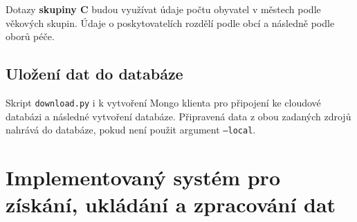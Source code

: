 \documentclass[11pt, a4paper]{article}
\theoremstyle{definition}
\theoremstyle{plain}
\begin{document}
Dotazy \textbf{skupiny C} budou využívat údaje počtu obyvatel v městech podle věkových skupin. Údaje o poskytovatelích rozdělí podle obcí a následně podle oborů péče.

\subsection{Uložení dat do databáze}
Skript \texttt{download.py} i k vytvoření Mongo klienta pro připojení ke cloudové databázi a následné vytvoření databáze. Připravená data z obou zadaných zdrojů nahrává do databáze, pokud není použit argument \texttt{--local}. 

\section{Implementovaný systém pro získání, ukládání a zpracování dat}
\end{document}

